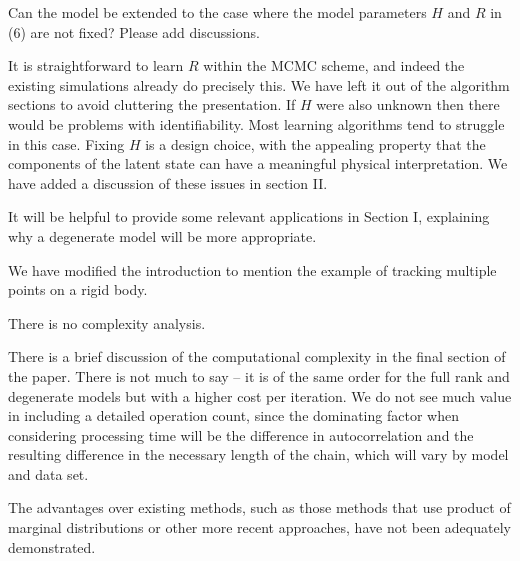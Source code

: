 \documentclass{article}
\newenvironment{review}[0]{\begin{itshape}\color{Gray}\noindent}{\end{itshape}\vspace{0.4cm}}
\newenvironment{response}[0]{\noindent}{\vspace{0.4cm}}
\begin{document}
\begin{review}
Can the model be extended to the case where the model parameters $H$ and $R$ in (6) are not fixed? Please add discussions.
\end{review}

\begin{response}
 It is straightforward to learn $R$ within the MCMC scheme, and indeed the existing simulations already do precisely this. We have left it out of the algorithm sections to avoid cluttering the presentation. If $H$ were also unknown then there would be problems with identifiability. Most learning algorithms tend to struggle in this case. Fixing $H$ is a design choice, with the appealing property that the components of the latent state can have a meaningful physical interpretation. We have added a discussion of these issues in section II.
\end{response}

\begin{review}
It will be helpful to provide some relevant applications in Section I, explaining why a degenerate model will be more appropriate.
\end{review}

\begin{response}
We have modified the introduction to mention the example of tracking multiple points on a rigid body.
\end{response}

\begin{review}
There is no complexity analysis.
\end{review}

\begin{response}
There is a brief discussion of the computational complexity in the final section of the paper. There is not much to say -- it is of the same order for the full rank and degenerate models but with a higher cost per iteration. We do not see much value in including a detailed operation count, since the dominating factor when considering processing time will be the difference in autocorrelation and the resulting difference in the necessary length of the chain, which will vary by model and data set.
\end{response}

\begin{review}
The advantages over existing methods, such as those methods that use product of marginal distributions or other more recent approaches, have not been adequately demonstrated.
\end{review}
\end{document}

